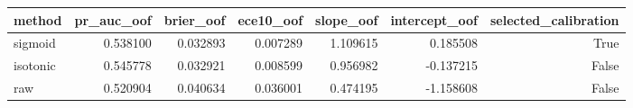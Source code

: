 \begin{tabular}{lrrrrrr}
\toprule
method & pr\_auc\_oof & brier\_oof & ece10\_oof & slope\_oof & intercept\_oof & selected\_calibration \\
\midrule
sigmoid & 0.538100 & 0.032893 & 0.007289 & 1.109615 & 0.185508 & True \\
isotonic & 0.545778 & 0.032921 & 0.008599 & 0.956982 & -0.137215 & False \\
raw & 0.520904 & 0.040634 & 0.036001 & 0.474195 & -1.158608 & False \\
\bottomrule
\end{tabular}
